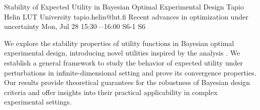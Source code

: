 \begin{talk}
  {Stability of Expected Utility in Bayesian Optimal Experimental Design}%
  {Tapio Helin}%
  {LUT University}%
  {tapio.helin@lut.fi}%
  {Recent advances in optimization under uncertainty}%
  {}%
  {Mon, Jul 28 15:30---16:00}%
  {S6-1}%
  {S6}%
    
   
We explore the stability properties of utility functions in Bayesian optimal experimental design, introducing novel utilities inspired by the analysis . We establish a general framework to study the behavior of expected utility under perturbations in infinite-dimensional setting and prove its convergence properties. Our results provide theoretical guarantees for the robustness of Bayesian design criteria and offer insights into their practical applicability in complex experimental settings.

\medskip

%
\end{talk}

